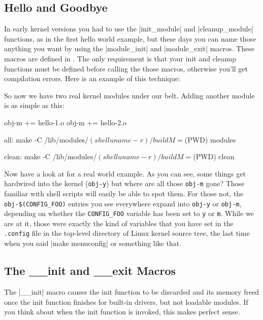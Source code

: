 \documentclass[10pt, oneside]{book}
\begin{document}
\subsection{Hello and Goodbye}
\label{hello_n_goodbye}
In early kernel versions you had to use the \cpp|init_module| and \cpp|cleanup_module| functions, as in the first hello world example, but these days you can name those anything you want by using the \cpp|module_init| and \cpp|module_exit| macros.
These macros are defined in .
The only requirement is that your init and cleanup functions must be defined before calling the those macros, otherwise you'll get compilation errors.
Here is an example of this technique:


So now we have two real kernel modules under our belt. Adding another module is as simple as this:

\begin{code}
obj-m += hello-1.o
obj-m += hello-2.o

all:
	make -C /lib/modules/$(shell uname -r)/build M=$(PWD) modules

clean:
	make -C /lib/modules/$(shell uname -r)/build M=$(PWD) clean
\end{code}

Now have a look at  for a real world example.
As you can see, some things get hardwired into the kernel (\verb|obj-y|) but where are all those \verb|obj-m| gone?
Those familiar with shell scripts will easily be able to spot them.
For those not, the \verb|obj-$(CONFIG_FOO)| entries you see everywhere expand into \verb|obj-y| or \verb|obj-m|, depending on whether the \verb|CONFIG_FOO| variable has been set to \verb|y| or \verb|m|.
While we are at it, those were exactly the kind of variables that you have set in the \verb|.config| file in the top-level directory of Linux kernel source tree, the last time when you said \sh|make menuconfig| or something like that.

\subsection{The \_\_init and \_\_exit Macros}
\label{init_n_exit}
The \cpp|__init| macro causes the init function to be discarded and its memory freed once the init function finishes for built-in drivers, but not loadable modules.
If you think about when the init function is invoked, this makes perfect sense.
\end{document}
